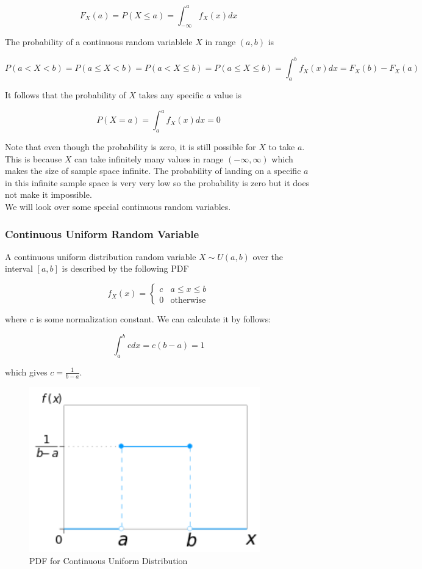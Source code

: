 \documentclass[12pt, a4paper]{article}
\begin{document}
$$F_X(a)=P(X\le a)=\int_{-\infty}^a f_X(x) dx$$

The probability of a continuous random variablele $X$ in range $(a,b)$ is

$$P(a < X < b)=P(a \le X < b)=P(a < X \le b)=P(a \le X \le b)=\int_a^b f_X(x) dx = F_X(b)-F_X(a)$$

It follows that the probability of $X$ takes any specific $a$ value is

$$P(X=a)=\int_{a}^a f_X(x) dx=0$$

Note that even though the probability is zero, it is still possible for $X$ to take $a$. This is because $X$ can take infinitely many values in range $(-\infty,\infty)$ which makes the size of sample space infinite. The probability of landing on a specific $a$ in this infinite sample space is very very low so the probability is zero but it does not make it impossible. \\

We will look over some special continuous random variables.

\subsubsection{Continuous Uniform Random Variable}

A continuous uniform distribution random variable $X\sim U(a, b)$ over the interval $[a,b]$ is described by the following PDF

$$
f_X(x)=\begin{cases}
c & a \le x \le b \\
0 & \text{otherwise}
\end{cases}
$$

where $c$ is some normalization constant. We can calculate it by follows:

\[\int_a^b cdx=c(b-a)=1\]

which gives $c=\frac{1}{b-a}$.

\begin{figure}[H]
\centering
\includegraphics[width=100mm]{13.png}
\caption{PDF for Continuous Uniform Distribution}
\end{figure}
\end{document}
